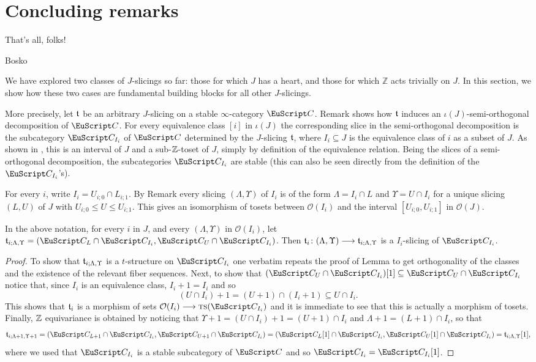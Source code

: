 \section{Concluding remarks}
\label{concluding}
\begin{modifyepigraph}{.2}
\epigraph{That's all, folks!}{Bosko}
\end{modifyepigraph}

We have explored two classes of $J$-slicings so far: those for which $J$ has a heart, and those for which $\mathbb{Z}$ acts trivially on $J$. In this section, we show how these two cases are fundamental building blocks for all other $J$-slicings. 

More precisely, let $\mathfrak{t}$ be an arbitrary $J$-slicing on a stable $\infty$-category $\C$. Remark  shows how $\mathfrak{t}$ induces an $\iota(J)$-semi-orthogonal decomposition of $\C$. For every equivalence class $[i]$ in $\iota(J)$ the corresponding slice in the semi-orthogonal decomposition is the subcategory $\C_{I_i}$ of $\C$ determined by the $J$-slicing $\mathfrak{t}$, where $I_i\subseteq J$ is the equivalence class of $i$ as a subset of $J$. As shown in , this is an interval of $J$ and a sub-$\mathbb{Z}$-toset of $J$, simply by definition of the equivalence relation. Being the slices of a semi-orthogonal decomposition, the subcategories $\C_{I_i}$ are stable (this can also be seen directly from the definition of the $\C_{I_i}$'s).

For every $i$, write $I_i=U_{i;0}\cap L_{i;1}$. By Remark  every slicing $(\Lambda,\Upsilon)$ of $I_i$ is of the form $\Lambda=I_{i}\cap L$ and $\Upsilon=U\cap I_{i}$ for a unique slicing $(L,U)$ of $J$ with $U_{i;0}\leq U\leq U_{i;1}$. This gives an isomorphism of tosets between $\mathcal{O}(I_i)$ and the interval $[U_{i;0},U_{i;1}]$ in $\mathcal{O}(J)$.
\begin{lemma}
In the above notation, for every $i$ in $J$, and every $(\Lambda,\Upsilon)$ in $\mathcal{O}(I_i)$, let $\tee_{i;\Lambda,\Upsilon}=(\C_L\cap \C_{I_i},\C_U\cap \C_{I_i})$. Then $\mathfrak{t}_i\colon (\Lambda,\Upsilon)\longrightarrow \mathfrak{t}_{i;\Lambda,\Upsilon}$ is a $I_i$-slicing of $\C_{I_i}$.
\end{lemma}
\begin{proof}To show that $\mathfrak{t}_{i;\Lambda,\Upsilon}$ is a $t$-structure on $\C_{I_i}$ one verbatim repeats the proof of Lemma  to get orthogonality of the classes and the existence of the relevant fiber sequences. Next, to show that $(\C_U\cap \C_{I_i})[1]\subseteq \C_U\cap \C_{I_i}$ notice that, since $I_i$ is an equivalence class, $I_i+1=I_i$ and so 
\[
(U\cap I_{i})+1=(U+1)\cap (I_i+1)\subseteq U\cap I_i.
\]
This shows that $\mathfrak{t}_i$ is a morphism of sets $\mathcal{O}(I_i)\to \ts(\C_{I_i})$ and it is immediate to see that this is actually a morphism of tosets. Finally, $\mathbb{Z}$ equivariance is obtained by noticing that $\Upsilon+1=(U\cap I_i)+1=(U+1)\cap I_i$ and $\Lambda+1=(L+1)\cap I_i$, so that
\[
\tee_{i;\Lambda+1,\Upsilon+1}=(\C_{L+1}\cap \C_{I_i},\C_{U+1}\cap \C_{I_i})=(\C_L[1]\cap \C_{I_i},\C_U[1]\cap \C_{I_i})=\tee_{i;\Lambda,\Upsilon}[1],
\]
where we used that $\C_{I_i}$ is a stable subcategory of $\C$ and so $\C_{I_i}=\C_{I_i}[1]$.
\end{proof}

